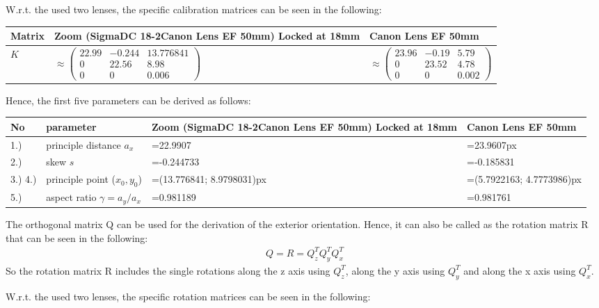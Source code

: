 \documentclass[a4paper,headings=small]{scrartcl}
\numberwithin{equation}{section} %
\numberwithin{figure}{section}   %
\begin{document}
W.r.t. the used two lenses, the specific calibration matrices can be seen in the following:

\begin{tabular}{ l ||p{7cm} || p{6cm}}
      Matrix & Zoom (SigmaDC 18-2Canon Lens EF 50mm) Locked at 18mm & Canon Lens EF 50mm \\
      \hline
      $K$ & $\approx
\left( \begin{array}{cccc}
22.99 & -0.244 & 13.776841 \\
 0        & 22.56   & 8.98 \\
 0        &  0          & 0.006
\end{array} \right)$  &  
$\approx
\left( \begin{array}{cccc}
23.96 & -0.19 & 5.79 \\
 0        & 23.52   & 4.78 \\
 0        &  0          & 0.002
\end{array} \right)$  \\
\end{tabular}

Hence, the first five parameters can be derived as follows:

\begin{tabular}{ l l || p{6cm} || p{6cm}}
      No       & parameter                     & Zoom (SigmaDC 18-2Canon Lens EF 50mm) Locked at 18mm & Canon Lens EF 50mm \\
      \hline
      1.)      & principle distance $a_x$      & =22.9907   &  =23.9607px \\
      2.)      & skew $s$                      & =-0.244733 &  =-0.185831   \\
      3.)  4.) & principle point ($x_0, y_0$)  & =(13.776841; 8.9798031)px &  =(5.7922163; 4.7773986)px\\
      5.)      & aspect ratio $\gamma=a_y/a_x$ & =0.981189 &  =0.981761 
\end{tabular}

The orthogonal matrix Q can be used for the derivation of the exterior orientation.
Hence, it can also be called as the rotation matrix R that can be seen in the following:
\begin{align}
Q=R=Q_z^TQ_y^TQ_x^T 
\end{align}
So the rotation matrix R includes the single rotations along the z axis using $Q_z^T$,
along the y axis using $Q_y^T$ and along the x axis using $Q_x^T$.

W.r.t. the used two lenses, the specific rotation matrices can be seen in the following:
\end{document}
